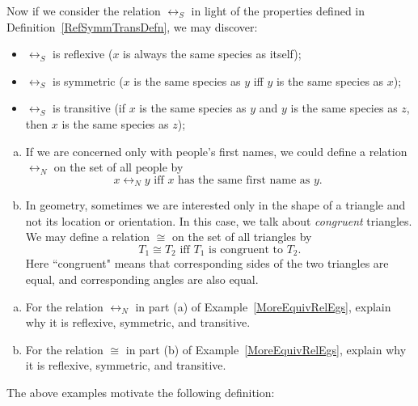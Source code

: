 Now if we consider the relation $\rel_S$ in light of the properties defined in Definition~\ref{RefSymmTransDefn}, we may discover:
\begin{itemize}
\item  $\rel_S$ is reflexive ($x$ is always the same species as itself);
\item  $\rel_S$ is symmetric ($x$ is the same species as $y$ iff $y$ is the same species as $x$);
\item  $\rel_S$ is transitive (if $x$ is the same species as $y$ and $y$ is the same species as $z$, then $x$ is the same species as $z$);
\end{itemize}

\begin{eg} \label{MoreEquivRelEgs}
\begin{enumerate}[(a)]
\item
If we are concerned only with people's first names, we could define a relation~$\rel_N$ on the set of all people by 
	$$ \text{$x \rel_N y$ iff $x$~has the same first name as~$y$. } $$
\item In geometry, sometimes we are interested only in the shape of a triangle and not its location or orientation. In this case, we talk about \emph{congruent} triangles. We may define a relation $\cong$ on the set of all triangles by 
	$$ \text{$T_1 \cong T_2$ iff $T_1$ is {congruent} to~$T_2$.} $$
Here ``congruent" means that corresponding sides of the two triangles are equal, and corresponding angles are also equal.
\end{enumerate}
\end{eg}

\begin{exercise}{}
\begin{enumerate}[(a)]
\item
For the relation $\rel_N$ in part (a) of Example~\ref{MoreEquivRelEgs}, explain why it is reflexive, symmetric, and transitive.
\item
For the relation $\cong$ in part (b) of Example~\ref{MoreEquivRelEgs}, explain why it is reflexive, symmetric, and transitive.

\end{enumerate}
\end{exercise}

The above examples motivate the following definition:

